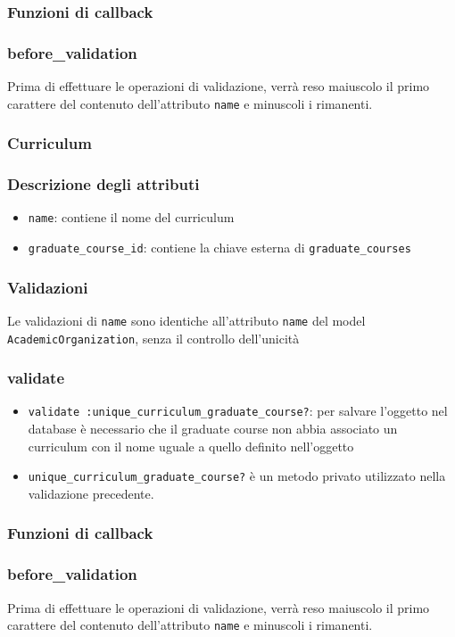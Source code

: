\documentclass[11pt,a4paper]{article}
\begin{document}
\subsubsection*{Funzioni di callback}
\subsubsection*{before\_validation}
Prima di effettuare le operazioni di validazione, verrà reso maiuscolo il primo carattere del contenuto dell'attributo \verb|name| e minuscoli i rimanenti.
\subsubsection{Curriculum}
\subsubsection*{Descrizione degli attributi}
\begin{itemize}
 \item \verb|name|: contiene il nome del curriculum
 \item \verb|graduate_course_id|: contiene la chiave esterna di \verb|graduate_courses|
\end{itemize}
\subsubsection*{Validazioni}
Le validazioni di \verb|name| sono identiche all'attributo \verb|name| del model \\ \verb|AcademicOrganization|, senza il controllo dell'unicità
\subsubsection*{validate}
\begin{itemize}
 \item \verb|validate :unique_curriculum_graduate_course?|: per salvare l'og\-getto nel database è necessario che il graduate course non abbia associato un curriculum con il nome uguale a quello definito nell'oggetto
\item \verb|unique_curriculum_graduate_course?| è un metodo privato utilizzato nella validazione precedente.
\end{itemize}
\subsubsection*{Funzioni di callback}
\subsubsection*{before\_validation}
Prima di effettuare le operazioni di validazione, verrà reso maiuscolo il primo carattere del contenuto dell'attributo \verb|name| e minuscoli i rimanenti.
\end{document}
